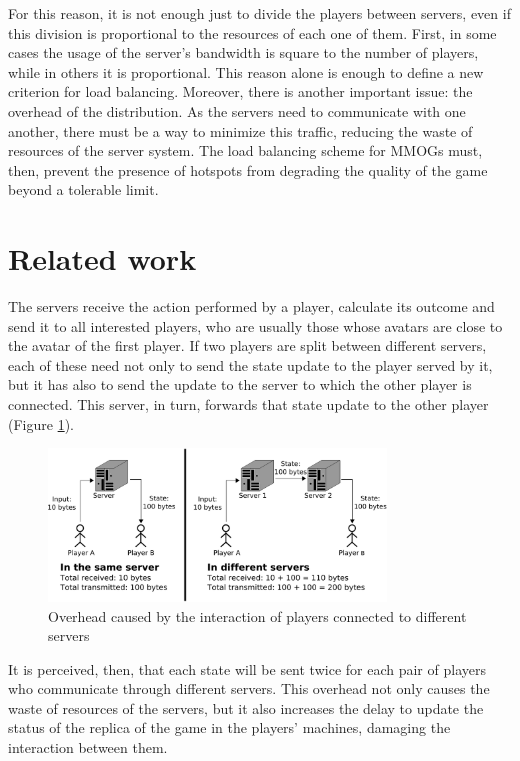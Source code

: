 For this reason, it is not enough just to divide the players between servers, even if this division is proportional to the resources of each one of them. First, in some cases the usage of the server's bandwidth is square to the number of players, while in others it is proportional. This reason alone is enough to define a new criterion for load balancing. Moreover, there is another important issue: the overhead of the distribution. As the servers need to communicate with one another, there must be a way to minimize this traffic, reducing the waste of resources of the server system. The load balancing scheme for MMOGs must, then, prevent the presence of hotspots from degrading the quality of the game beyond a tolerable limit.




\section{Related work}
\label{sec:related}

The servers receive the action performed by a player, calculate its outcome and send it to all interested players, who are usually those whose avatars are close to the avatar of the first player. If two players are split between different servers, each of these need not only to send the state update to the player served by it, but it has also to send the update to the server to which the other player is connected. This server, in turn, forwards that state update to the other player (Figure \ref{fig:overheadgeneration}).

\begin{figure}
 \centering
 \includegraphics[width=0.8\textwidth]{images/overheadgeneration}
 \caption{Overhead caused by the interaction of players connected to different servers}
 \label{fig:overheadgeneration}
\end{figure}

It is perceived, then, that each state will be sent twice for each pair of players who communicate through different servers. This overhead not only causes the waste of resources of the servers, but it also increases the delay to update the status of the replica of the game in the players' machines, damaging the interaction between them.
	
